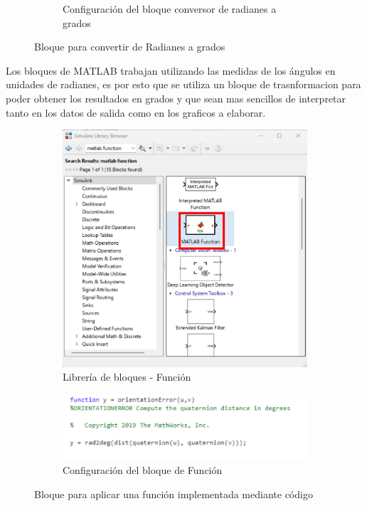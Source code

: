 \begin{figure}[htbp]
\begin{subfigure}[b]{0.45\textwidth}
        \caption{Configuración del bloque conversor de radianes a grados}
        \label{fig:conf_bloques_R2D}
    \end{subfigure}
    \caption{Bloque para convertir de Radianes a grados}
    \label{fig:bloques_R2D}
\end{figure}

Los bloques de MATLAB trabajan utilizando las medidas de los ángulos en unidades de radianes, es por esto que se utiliza un bloque de trasnformacion para poder obtener los resultados en grados y que sean mas sencillos de interpretar tanto en los datos de salida como en los graficos a elaborar.



\begin{figure}[htbp]
    \centering
    \begin{subfigure}[b]{0.35\textwidth}
        \centering
        \includegraphics[width=\textwidth]{fig/Capitulo5/Caso_de_estudio_IMU/Generador_de_salidas/libreria_bloque_de_funcion.pdf}
        \caption{Librería de bloques - Función}
        \label{fig:lib_bloques_func}
    \end{subfigure}
    \hfill
    \begin{subfigure}[b]{0.45\textwidth}
        \centering
        \includegraphics[width=\textwidth]{fig/Capitulo5/Caso_de_estudio_IMU/Generador_de_salidas/configuracion_codigo.pdf}
        \caption{Configuración del bloque de Función}
        \label{fig:config_bloques_func}
    \end{subfigure}
    \caption{Bloque para aplicar una función implementada mediante código}
    \label{fig:bloques_func}
\end{figure}

